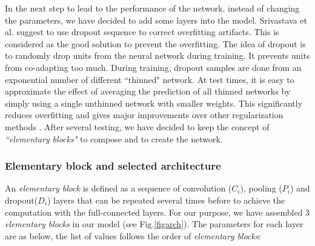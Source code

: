 \documentclass{article} %
\begin{document}
\begin{multicols}{2}
In the next step to lead to the performance of the network, instead of changing the parameters, we have decided to add some layers into the model. Srivastava et al. \cite{srivastava2014dropout} suggest to use dropout sequence to correct overfitting artifacts. This is considered as the good solution to prevent the overfitting. The idea of dropout is to randomly drop units from the neural network during training. It prevents units from co-adapting too much. During training, dropout samples are done from an exponential number of different ``thinned" network. At test times, it is easy to approximate the effect of averaging the prediction of all thinned networks by simply using a single unthinned network with smaller weights. This significantly reduces overfitting and gives major improvements over other regularization methods \cite{srivastava2014dropout}. After several testing, we have decided to keep the concept of \textit{``elementary blocks"} to compose and to create the network.

\subsubsection{Elementary block and selected architecture}
An \textit{elementary block} is defined as a sequence of
convolution (\textit{$C_i$}), pooling (\textit{$P_i$}) and dropout(\textit{$D_i$}) layers that can be repeated several
times before to achieve the computation with the full-connected
layers. For our purpose, we have assembled $3$ \textit{elementary
  blocks} in our model (see Fig.\ref{figarch}). The parameters for
each layer are as below, the list of values follows the order of
\textit{elementary blocks}:

\begin{itemize}[nosep,label=\footnotesize$\bullet$]


\end{itemize}
\end{multicols}
\end{document}

